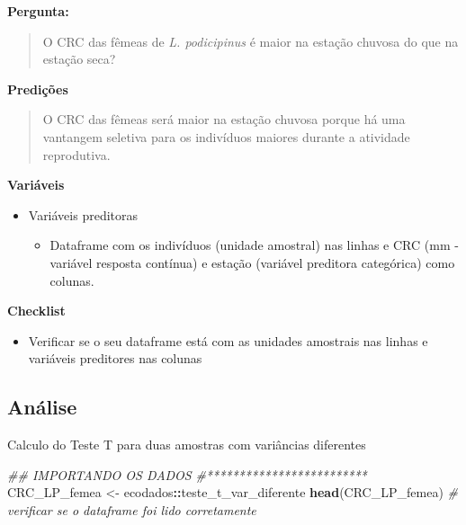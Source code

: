 \documentclass[
]{book}
\newenvironment{Shaded}{\begin{snugshade}}{\end{snugshade}}
\newcommand{\CommentTok}[1]{\textcolor[rgb]{0.56,0.35,0.01}{\textit{#1}}}
\newcommand{\KeywordTok}[1]{\textcolor[rgb]{0.13,0.29,0.53}{\textbf{#1}}}
\newcommand{\NormalTok}[1]{#1}
\newcommand{\OperatorTok}[1]{\textcolor[rgb]{0.81,0.36,0.00}{\textbf{#1}}}
\newcommand{\StringTok}[1]{\textcolor[rgb]{0.31,0.60,0.02}{#1}}
\providecommand{\tightlist}{%
  \setlength{\itemsep}{0pt}\setlength{\parskip}{0pt}}
\begin{document}
\textbf{Pergunta:}

\begin{quote}
O CRC das fêmeas de \emph{L. podicipinus} é maior na estação chuvosa do que na estação seca?
\end{quote}

\textbf{Predições}

\begin{quote}
O CRC das fêmeas será maior na estação chuvosa porque há uma vantangem seletiva para os indivíduos maiores durante a atividade reprodutiva.
\end{quote}

\textbf{Variáveis}

\begin{itemize}
\tightlist
\item
  Variáveis preditoras

  \begin{itemize}
  \tightlist
  \item
    Dataframe com os indivíduos (unidade amostral) nas linhas e CRC (mm - variável resposta contínua) e estação (variável preditora categórica) como colunas.
  \end{itemize}
\end{itemize}

\textbf{Checklist}

\begin{itemize}
\tightlist
\item
  Verificar se o seu dataframe está com as unidades amostrais nas linhas e variáveis preditores nas colunas
\end{itemize}

\hypertarget{anuxe1lise-1}{%
\subsection{Análise}\label{anuxe1lise-1}}

Calculo do Teste T para duas amostras com variâncias diferentes

\begin{Shaded}
\begin{Highlighting}[]
\CommentTok{## IMPORTANDO OS DADOS}
\CommentTok{#*************************}
\NormalTok{CRC_LP_femea <-}\StringTok{ }\NormalTok{ecodados}\OperatorTok{::}\NormalTok{teste_t_var_diferente}
\KeywordTok{head}\NormalTok{(CRC_LP_femea) }\CommentTok{# verificar se o dataframe foi lido corretamente}
\end{Highlighting}
\end{Shaded}
\end{document}
